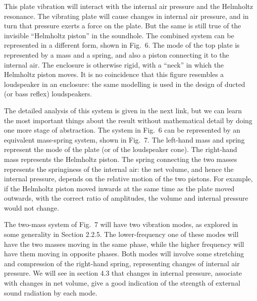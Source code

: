 
  This plate vibration will interact with the internal air pressure and the 
  Helmholtz resonance. The vibrating plate will cause changes in internal air 
  pressure, and in turn that pressure exerts a force on the plate. But the same 
  is still true of the invisible ``Helmholtz piston'' in the soundhole. The 
  combined system can be represented in a different form, shown in Fig.\ 6. The 
  mode of the top plate is represented by a mass and a spring, and also a 
  piston connecting it to the internal air. The enclosure is otherwise rigid, 
  with a ``neck'' in which the Helmholtz piston moves. It is no coincidence 
  that this figure resembles a loudspeaker in an enclosure: the same modelling 
  is used in the design of ducted (or bass reflex) loudspeakers. 


  The detailed analysis of this system is given in the next link, but we can 
  learn the most important things about the result without mathematical detail 
  by doing one more stage of abstraction. The system in Fig.\ 6 can be 
  represented by an equivalent mass-spring system, shown in Fig.\ 7. The 
  left-hand mass and spring represent the mode of the plate (or of the 
  loudspeaker cone). The right-hand mass represents the Helmholtz piston. The 
  spring connecting the two masses represents the springiness of the internal 
  air: the net volume, and hence the internal pressure, depends on the relative 
  motion of the two pistons. For example, if the Helmholtz piston moved inwards 
  at the same time as the plate moved outwards, with the correct ratio of 
  amplitudes, the volume and internal pressure would not change. 


  The two-mass system of Fig.\ 7 will have two vibration modes, as explored in 
  some generality in Section 2.2.5. The lower-frequency one of these modes will 
  have the two masses moving in the same phase, while the higher frequency will 
  have them moving in opposite phases. Both modes will involve some stretching 
  and compression of the right-hand spring, representing changes of internal 
  air pressure. We will see in section 4.3 that changes in internal pressure, 
  associate with changes in net volume, give a good indication of the strength 
  of external sound radiation by each mode. 

